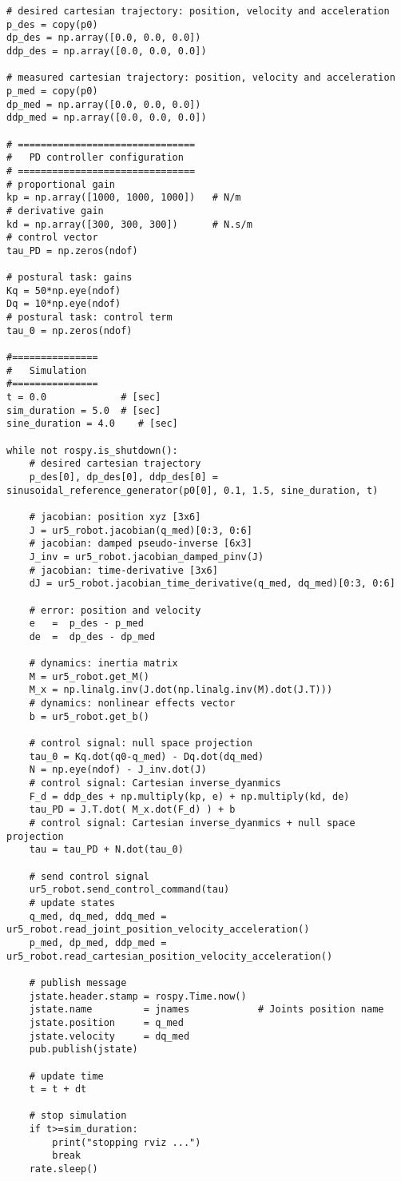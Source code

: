 \begin{lstlisting}
# desired cartesian trajectory: position, velocity and acceleration
p_des = copy(p0)
dp_des = np.array([0.0, 0.0, 0.0])
ddp_des = np.array([0.0, 0.0, 0.0])

# measured cartesian trajectory: position, velocity and acceleration
p_med = copy(p0)
dp_med = np.array([0.0, 0.0, 0.0])
ddp_med = np.array([0.0, 0.0, 0.0])

# ===============================
#   PD controller configuration
# ===============================
# proportional gain
kp = np.array([1000, 1000, 1000])   # N/m
# derivative gain   
kd = np.array([300, 300, 300])      # N.s/m
# control vector
tau_PD = np.zeros(ndof)    

# postural task: gains
Kq = 50*np.eye(ndof)
Dq = 10*np.eye(ndof)
# postural task: control term
tau_0 = np.zeros(ndof)

#===============
#   Simulation
#===============
t = 0.0             # [sec] 
sim_duration = 5.0  # [sec]
sine_duration = 4.0    # [sec]

while not rospy.is_shutdown():
    # desired cartesian trajectory
    p_des[0], dp_des[0], ddp_des[0] = sinusoidal_reference_generator(p0[0], 0.1, 1.5, sine_duration, t)

    # jacobian: position xyz [3x6]
    J = ur5_robot.jacobian(q_med)[0:3, 0:6]  
    # jacobian: damped pseudo-inverse [6x3]
    J_inv = ur5_robot.jacobian_damped_pinv(J)   
    # jacobian: time-derivative [3x6]
    dJ = ur5_robot.jacobian_time_derivative(q_med, dq_med)[0:3, 0:6]

    # error: position and velocity
    e 	=  p_des - p_med
    de 	=  dp_des - dp_med    

    # dynamics: inertia matrix
    M = ur5_robot.get_M()
    M_x = np.linalg.inv(J.dot(np.linalg.inv(M).dot(J.T)))
    # dynamics: nonlinear effects vector
    b = ur5_robot.get_b()

    # control signal: null space projection
    tau_0 = Kq.dot(q0-q_med) - Dq.dot(dq_med)
    N = np.eye(ndof) - J_inv.dot(J)
    # control signal: Cartesian inverse_dyanmics
    F_d = ddp_des + np.multiply(kp, e) + np.multiply(kd, de)
    tau_PD = J.T.dot( M_x.dot(F_d) ) + b  
    # control signal: Cartesian inverse_dyanmics + null space projection
    tau = tau_PD + N.dot(tau_0)
    
    # send control signal
    ur5_robot.send_control_command(tau)
    # update states
    q_med, dq_med, ddq_med = ur5_robot.read_joint_position_velocity_acceleration()
    p_med, dp_med, ddp_med = ur5_robot.read_cartesian_position_velocity_acceleration()

    # publish message
    jstate.header.stamp = rospy.Time.now()
    jstate.name 		= jnames			# Joints position name
    jstate.position 	= q_med
    jstate.velocity 	= dq_med
    pub.publish(jstate)

    # update time
    t = t + dt
    
    # stop simulation
    if t>=sim_duration:
        print("stopping rviz ...")
        break
    rate.sleep()
\end{lstlisting}

